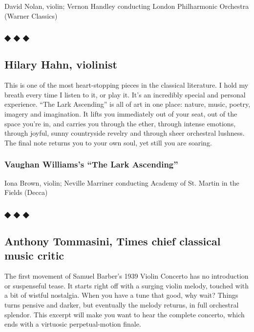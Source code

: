 David Nolan, violin; Vernon Handley conducting London Philharmonic
Orchestra (Warner Classics)

\hypertarget{---10}{%
\subsubsection{◆ ◆ ◆}\label{---10}}

\hypertarget{hilary-hahn-violinist}{%
\subsection{Hilary Hahn, violinist}\label{hilary-hahn-violinist}}

This is one of the most heart-stopping pieces in the classical
literature. I hold my breath every time I listen to it, or play it. It's
an incredibly special and personal experience. ``The Lark Ascending'' is
all of art in one place: nature, music, poetry, imagery and imagination.
It lifts you immediately out of your seat, out of the space you're in,
and carries you through the ether, through intense emotions, through
joyful, sunny countryside revelry and through sheer orchestral lushness.
The final note returns you to your own soul, yet still you are soaring.

\hypertarget{vaughan-williamss-the-lark-ascending-1}{%
\subsubsection{Vaughan Williams's ``The Lark
Ascending''}\label{vaughan-williamss-the-lark-ascending-1}}

Iona Brown, violin; Neville Marriner conducting Academy of St. Martin in
the Fields (Decca)

\hypertarget{---11}{%
\subsubsection{◆ ◆ ◆}\label{---11}}

\hypertarget{anthony-tommasini-times-chief-classical-music-critic}{%
\subsection{Anthony Tommasini, Times chief classical music
critic}\label{anthony-tommasini-times-chief-classical-music-critic}}

The first movement of Samuel Barber's 1939 Violin Concerto has no
introduction or suspenseful tease. It starts right off with a surging
violin melody, touched with a bit of wistful nostalgia. When you have a
tune that good, why wait? Things turns pensive and darker, but
eventually the melody returns, in full orchestral splendor. This excerpt
will make you want to hear the complete concerto, which ends with a
virtuosic perpetual-motion finale.

